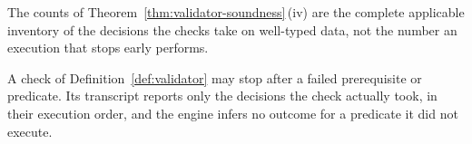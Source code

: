 
The counts of Theorem~\ref{thm:validator-soundness}\,(iv) are the complete applicable
inventory of the decisions the checks take on well-typed data, not the number
an execution that stops early performs.

\begin{requirement}\label{req:validation-transcript}
A check of Definition~\ref{def:validator} may stop after a failed
prerequisite or predicate. Its transcript reports only the decisions the check
actually took, in their execution order, and the engine infers no outcome for
a predicate it did not execute.
\end{requirement}
